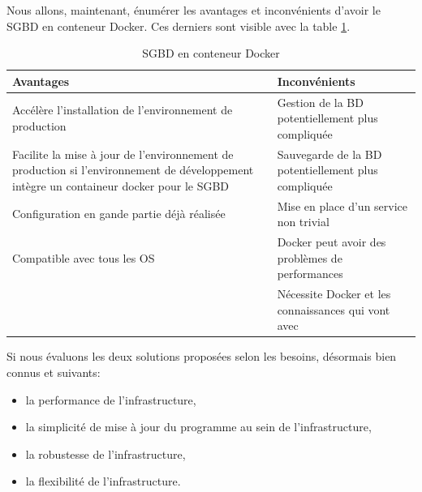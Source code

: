 \documentclass[
    iai, %
    il, %
]{heig-tb}
\begin{document}
Nous allons, maintenant, énumérer les avantages et inconvénients d'avoir le SGBD en conteneur
Docker. Ces derniers sont visible avec la table \ref{prod-db-docker}.

\begin{table}[h]
    \begin{center}
        \caption{SGBD en conteneur Docker \label{prod-db-docker}}
        \begin{tabularx}{1.0\textwidth} {X|X}
            Avantages                                                & Inconvénients                                                        \\ \hline
            Accélère l'installation de l'environnement de production & Gestion de la BD
            potentiellement plus compliquée                                                                                                 \\
            Facilite la mise à jour de l'environnement de production si l'environnement de
            développement intègre un containeur docker pour le SGBD  & Sauvegarde de la BD
            potentiellement plus compliquée                                                                                                 \\
            Configuration en gande partie déjà réalisée              & Mise en place d'un service non trivial                               \\
            Compatible avec tous les OS                              & Docker peut avoir des problèmes de performances
            \cite{labrecque}                                                                                                                \\
                                                                     & Nécessite Docker et les connaissances qui vont avec \cite{labrecque} \\
        \end{tabularx}
    \end{center}
\end{table}

Si nous évaluons les deux solutions proposées selon les besoins, désormais bien connus et suivants:
\begin{itemize}
    \item la performance de l'infrastructure,
    \item la simplicité de mise à jour du programme au sein de l'infrastructure,
    \item la robustesse de l'infrastructure,
    \item la flexibilité de l'infrastructure.
\end{itemize}
\end{document}
